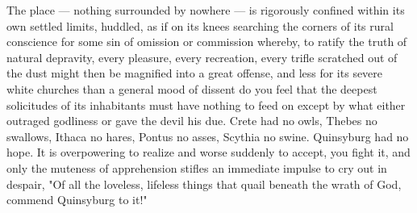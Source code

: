   The place --- nothing surrounded by nowhere --- is rigorously confined within its 
own settled limits, huddled, as if on its knees searching the corners of its rural 
conscience for some sin of omission or commission whereby, to ratify 
the truth of natural depravity, every pleasure, every recreation, every trifle 
scratched out of the 
dust might then be magnified into a great offense, and less for its severe white 
churches than a general mood of dissent do you feel that the deepest solicitudes 
of its inhabitants must have nothing to feed on except by what either outraged 
godliness or gave the devil his due. Crete had no owls, Thebes no swallows, Ithaca 
no hares, Pontus no asses, Scythia no swine. Quinsyburg had no hope. It is 
overpowering to realize and worse suddenly to accept, you fight it, and only the 
muteness of apprehension stifles 
an immediate impulse to cry out in despair, "Of 
all the loveless, lifeless things that quail 
beneath the wrath of God, commend 
Quinsyburg to it!"
 
 
 
